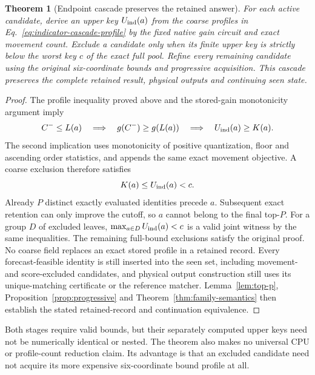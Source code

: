 \documentclass[11pt]{article}
\newtheorem{theorem}{Theorem}
\begin{document}
\begin{theorem}[Endpoint cascade preserves the retained answer]\label{thm:indicator-cascade}
For each active candidate, derive an upper key $U_{\rm ind}(a)$ from the coarse profiles in Eq.~\eqref{eq:indicator-cascade-profile} by the fixed native gain circuit and exact movement count. Exclude a candidate only when its finite upper key is strictly below the worst key $c$ of the exact full pool. Refine every remaining candidate using the original six-coordinate bounds and progressive acquisition. This cascade preserves the complete retained result, physical outputs and continuing seen state.
\end{theorem}
\begin{proof}
The profile inequality proved above and the stored-gain monotonicity argument imply
\begin{equation}
C^-\le L(a)\quad\Longrightarrow\quad
g(C^-)\ge g(L(a))\quad\Longrightarrow\quad
U_{\rm ind}(a)\ge K(a).
\label{eq:cascade-key-domination}
\end{equation}
The second implication uses monotonicity of positive quantization, floor and ascending order statistics, and appends the same exact movement objective. A coarse exclusion therefore satisfies
\begin{equation}
K(a)\le U_{\rm ind}(a)<c.
\end{equation}
Already $P$ distinct exactly evaluated identities precede $a$. Subsequent exact retention can only improve the cutoff, so $a$ cannot belong to the final top-$P$. For a group $D$ of excluded leaves, $\max_{a\in D}U_{\rm ind}(a)<c$ is a valid joint witness by the same inequalities. The remaining full-bound exclusions satisfy the original proof. No coarse field replaces an exact stored profile in a retained record. Every forecast-feasible identity is still inserted into the seen set, including movement- and score-excluded candidates, and physical output construction still uses its unique-matching certificate or the reference matcher. Lemma~\ref{lem:top-p}, Proposition~\ref{prop:progressive} and Theorem~\ref{thm:family-semantics} then establish the stated retained-record and continuation equivalence.
\end{proof}

Both stages require valid bounds, but their separately computed upper keys need not be numerically identical or nested. The theorem also makes no universal CPU or profile-count reduction claim. Its advantage is that an excluded candidate need not acquire its more expensive six-coordinate bound profile at all.
\end{document}
